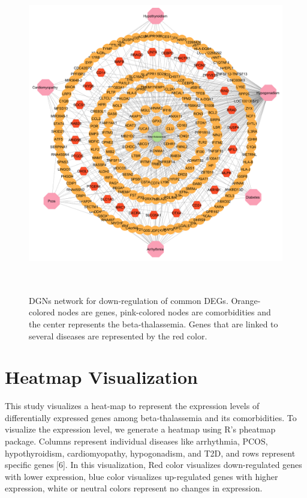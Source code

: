 \begin{figure}[H]
\centering
\includegraphics[height=14cm]{./fig/fig4_2.png} 
\centering
\caption{DGNs network for down-regulation of common DEGs.  Orange-colored nodes are genes, pink-colored nodes are comorbidities and the center represents the beta-thalassemia. Genes that are linked to several diseases are represented by the red color.}
\label{Loss_Curve}
\end{figure}

\section{Heatmap Visualization}
\label{sec:sec4_3}
This study visualizes a heat-map to represent the expression levels of differentially expressed genes among beta-thalassemia and its comorbidities. To visualize the expression level, we generate a heatmap using R's pheatmap package. Columns represent individual diseases like arrhythmia, PCOS, hypothyroidism, cardiomyopathy, hypogonadism, and T2D, and rows represent specific genes [6]. In this visualization, Red color visualizes down-regulated genes with lower expression, blue color visualizes up-regulated genes with higher expression, white or neutral colors represent no changes in expression.\\

